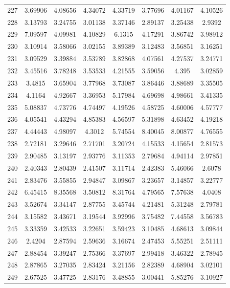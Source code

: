 \begin{figure}
\begin{tabular}{cccccccc}
227 & 3.69906 & 4.08656 & 4.34072 & 4.33719 & 3.77696 & 4.01167 & 4.10526\\
228 & 3.13793 & 3.24755 & 3.01138 & 3.37146 & 2.89137 & 3.25438 & 2.9392\\
229 & 7.09597 & 4.09981 & 4.10829 & 6.1315 & 4.17291 & 3.86742 & 3.98912\\
230 & 3.10914 & 3.58066 & 3.02155 & 3.89389 & 3.12483 & 3.56851 & 3.16251\\
231 & 3.09529 & 3.39884 & 3.53789 & 3.82868 & 4.07561 & 4.27537 & 3.24771\\
232 & 3.45516 & 3.78248 & 3.53533 & 4.21555 & 3.59056 & 4.395 & 3.02859\\
233 & 3.4815 & 3.65904 & 3.77968 & 3.73087 & 3.86446 & 3.88689 & 3.35505\\
234 & 4.1164 & 4.92667 & 3.36953 & 5.17984 & 4.69698 & 4.98661 & 3.41335\\
235 & 5.08837 & 4.73776 & 4.74497 & 4.19526 & 4.58725 & 4.60006 & 4.57777\\
236 & 4.05541 & 4.43294 & 4.85383 & 4.56597 & 5.31898 & 4.63452 & 4.19218\\
237 & 4.44443 & 4.98097 & 4.3012 & 5.74554 & 8.40045 & 8.00877 & 4.76555\\
238 & 2.72181 & 3.29646 & 2.71701 & 3.20724 & 4.15533 & 4.15654 & 2.81573\\
239 & 2.90485 & 3.13197 & 2.93776 & 3.11353 & 2.79684 & 4.94114 & 2.97851\\
240 & 2.40343 & 2.80439 & 2.41507 & 3.11714 & 2.42383 & 5.46066 & 2.6078\\
241 & 2.83476 & 3.55855 & 2.94847 & 3.09867 & 3.23657 & 3.14857 & 3.22777\\
242 & 6.45415 & 8.35568 & 3.50812 & 8.31764 & 4.79565 & 7.57638 & 4.0408\\
243 & 3.52674 & 3.34147 & 2.87755 & 3.45744 & 4.21481 & 5.31248 & 2.79781\\
244 & 3.15582 & 3.43671 & 3.19544 & 3.92996 & 3.75482 & 7.44558 & 3.56783\\
245 & 3.33359 & 3.42533 & 3.22651 & 3.59423 & 3.10485 & 4.68613 & 3.09844\\
246 & 2.4204 & 2.87594 & 2.59636 & 3.16674 & 2.47453 & 5.55251 & 2.51111\\
247 & 2.88454 & 3.39247 & 2.75366 & 3.37697 & 2.99418 & 3.46322 & 2.78945\\
248 & 2.87865 & 3.27035 & 2.83424 & 3.21156 & 2.82389 & 4.68904 & 3.02101\\
249 & 2.67525 & 3.47725 & 2.83176 & 3.48855 & 3.00441 & 5.85276 & 3.10927\\

\end{tabular}
\end{figure}
